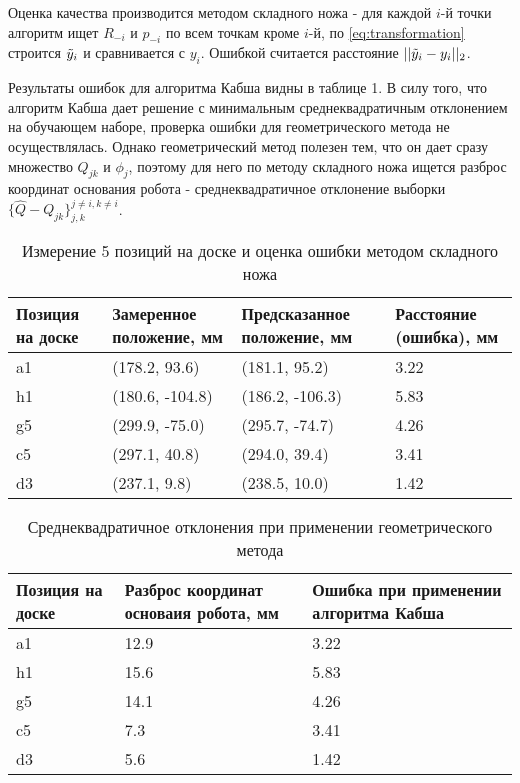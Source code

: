 \documentclass[a4paper,12pt]{extarticle}
\begin{document}
Оценка качества производится методом складного ножа - для каждой $i$-й точки алгоритм ищет $R_{-i}$ и $p_{-i}$ по всем точкам кроме $i$-й, по \ref{eq:transformation} строится 
$\tilde{\boldmath{y}}_i$ и сравнивается с $y_i$. Ошибкой считается расстояние $||\tilde{\boldmath{y}}_i - y_i||_2$.

Результаты ошибок для алгоритма Кабша видны в таблице 1. В силу того, что алгоритм Кабша дает решение с минимальным среднеквадратичным отклонением на обучающем наборе,
проверка ошибки для геометрического метода не осуществлялась. Однако геометрический метод полезен тем, что он дает сразу множество $Q_{jk}$ и $\phi_j$, поэтому для него 
по методу складного ножа ищется разброс координат основания робота - среднеквадратичное отклонение выборки $\{\hat Q - Q_{jk}\}_{j,k}^{j\neq i, k\neq i}$.
\begin{center}
    \begin{longtable}{|p{2cm}|p{5cm}|p{5cm}|p{3cm}|}
    \caption{Измерение 5 позиций на доске и оценка ошибки методом складного ножа}\\
    \hline
    Позиция на доске & Замеренное положение, мм & Предсказанное положение, мм & Расстояние (ошибка), мм\\
    \hline
    a1&(178.2, 93.6)&(181.1, 95.2)&3.22\\\hline h1&(180.6, -104.8)&(186.2, -106.3)&5.83\\\hline g5&(299.9, -75.0)&(295.7, -74.7)&4.26\\\hline c5&(297.1, 40.8)&(294.0, 39.4)&3.41\\\hline d3&(237.1, 9.8)&(238.5, 10.0)&1.42\\\hline 
    
    \end{longtable}
\end{center}

\begin{center}
    \begin{longtable}{|p{2cm}|p{5cm}|}
    \caption{Среднеквадратичное отклонения при применении геометрического метода}\\
    \hline
    Позиция на доске & Разброс координат основаия робота, мм & Ошибка при применении алгоритма Кабша\\
    \hline
    a1&12.9&3.22\\\hline h1&15.6&5.83\\\hline g5&14.1&4.26\\\hline c5&7.3&3.41\\\hline d3&5.6&1.42\\\hline
    \end{longtable}
\end{center}
\end{document}
